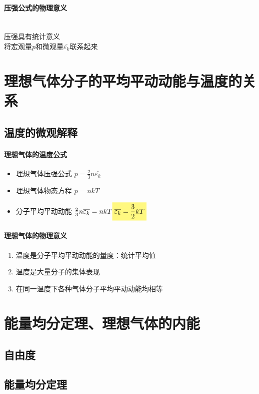\documentclass[UTF8,a4paper,12pt,scheme=chinese]{ctexbook}
\newcommand{\hla}[1]{%
	\colorbox{yellow!50}{$\displaystyle#1$}}
\begin{document}
	\paragraph{压强公式的物理意义}~{}\\
	压强具有统计意义\\
	将宏观量$p$和微观量$\overline{\varepsilon_k}$联系起来
	\section{理想气体分子的平均平动动能与温度的关系}
	\subsection{温度的微观解释}
	\paragraph{理想气体的温度公式}
	\begin{itemize}
		\item 理想气体压强公式 $p=\frac{2}{3}n\overline{\varepsilon_k}$
		\item 理想气体物态方程 $p=nkT$
		\item 分子平均平动动能 $\frac{2}{3}n\overline{\varepsilon_k} = nkT\\
		\hla{\overline{\varepsilon_k} = \frac{3}{2}kT}$
	\end{itemize}
	\paragraph{理想气体的物理意义}
	\begin{enumerate}
		\item 温度是分子平均平动动能的量度：统计平均值
		\item 温度是大量分子的集体表现
		\item 在同一温度下各种气体分子平均平动动能均相等
	\end{enumerate}
	\section{能量均分定理、理想气体的内能}
	\subsection{自由度}
	\subsection{能量均分定理}
\end{document}
